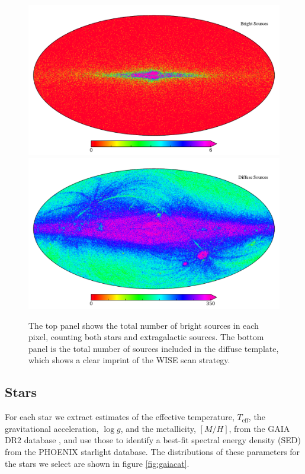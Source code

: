 \documentclass{aa}
\begin{document}
\begin{figure}
  \centering
  \includegraphics[width=\columnwidth]{figs/sourcecount/source_count.pdf}\\
  \includegraphics[width=\columnwidth]{figs/sourcecount/diffuse_count.pdf}
  \caption{The top panel shows the total number of bright sources in each pixel, counting both stars and extragalactic sources. The bottom panel is the total number of sources included in the diffuse template, which shows a clear imprint of the WISE scan strategy.}
  \label{fig:starcount}
\end{figure}

\subsection{Stars}

\label{sec:starmodel}

For each star we extract estimates of the effective temperature, $T_{\mathrm{eff}}$, the gravitational acceleration, $\log g$, and the metallicity, $[M/H]$, from the GAIA DR2 database \citep{gaiaCat}, and use those to identify a best-fit spectral energy density (SED) from the PHOENIX starlight database. The distributions of these parameters for the stars we select are shown in figure \ref{fig:gaiacat}.
\end{document}
